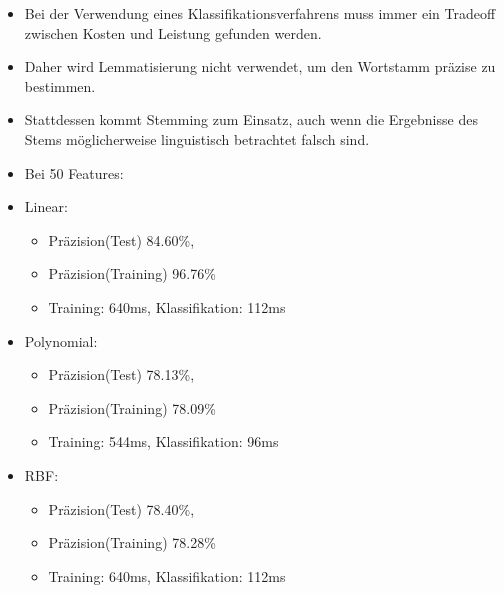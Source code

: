 \begin{frame}
\begin{itemize}
  \item Bei der Verwendung eines Klassifikationsverfahrens muss immer ein
  Tradeoff zwischen Kosten und Leistung gefunden werden.
  \item Daher wird Lemmatisierung nicht verwendet, um den Wortstamm präzise zu
  bestimmen.
  \item Stattdessen kommt Stemming zum Einsatz, auch wenn die Ergebnisse des
  Stems möglicherweise linguistisch betrachtet falsch sind.
\end{itemize}
\end{frame}
	
\begin{frame}
  \begin{itemize}
  \item Bei 50 Features:
  \item Linear: 
  \begin{itemize}
  \item Präzision(Test) 84.60\%,
  \item Präzision(Training)  96.76\%
  \item Training: 640ms, Klassifikation: 112ms
\end{itemize}
  \item Polynomial:
  \begin{itemize}
  \item Präzision(Test) 78.13\%,
  \item Präzision(Training)  78.09\%
  \item Training: 544ms, Klassifikation:
  96ms
\end{itemize}
  \item RBF: 
  \begin{itemize}
  \item Präzision(Test) 78.40\%,
  \item Präzision(Training)  78.28\%
  \item Training: 640ms,  Klassifikation: 112ms
\end{itemize}
\end{itemize}
\end{frame}

